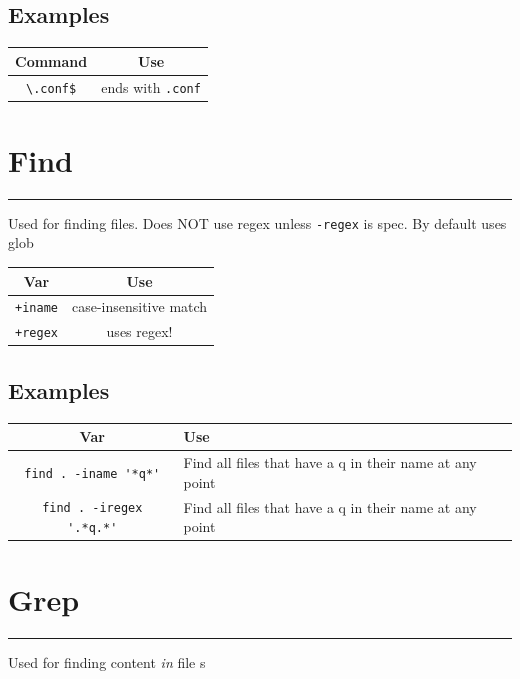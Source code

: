 \documentclass{article}
\theoremstyle{mytheoremstyle}
\theoremstyle{mytheoremstyle}
\theoremstyle{myproblemstyle}
\theoremstyle{myproblemstyle}
\begin{document}
    \begin{center}
    \subsection{Examples}
    \begin{tabular}{|c|c|}
    \hline
     Command & Use\\
    \hline
      \verb|\.conf$| & ends with \verb|.conf|\\ 
    \hline
    \end{tabular}
    \end{center}

    \pagebreak
    \section{Find}
    \hrule
    \vspace{.5cm}
    Used for finding files. Does NOT use regex unless \verb|-regex| is spec. By default uses glob

    \begin{center}
    \begin{tabular}{|c|c|}
    \hline
    Var & Use \\
    \hline
    \verb|+iname| & case-insensitive match \\
    \hline
    \verb|+regex| & uses regex!\\
    \hline
    \end{tabular}
    \end{center}

    \subsection{Examples}
    \begin{center}
    \begin{tabular}{|c|p{8cm}|}
    \hline
    Var & Use \\
    \hline
      \verb|find . -iname '*q*'| & Find all files that have a q in their name at any point \\
    \hline
      \verb|find . -iregex '.*q.*'| & Find all files that have a q in their name at any point \\
    \hline
    \end{tabular}
    \end{center}
    
    \pagebreak
    \section{Grep}
    \hrule
    \vspace{.5cm}
    Used for finding content \textit{in} file s
\end{document}
